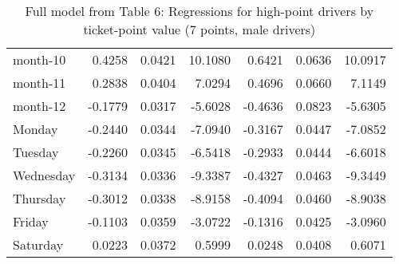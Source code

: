 \documentclass[10pt]{article}
\begin{document}
\begin{table}[ht]
\begin{tabular}{lrrrrrr}
  month-10 & 0.4258 & 0.0421 & 10.1080 & 0.6421 & 0.0636 & 10.0917 \\ 
  month-11 & 0.2838 & 0.0404 & 7.0294 & 0.4696 & 0.0660 & 7.1149 \\ 
  month-12 & -0.1779 & 0.0317 & -5.6028 & -0.4636 & 0.0823 & -5.6305 \\ 
  Monday & -0.2440 & 0.0344 & -7.0940 & -0.3167 & 0.0447 & -7.0852 \\ 
  Tuesday & -0.2260 & 0.0345 & -6.5418 & -0.2933 & 0.0444 & -6.6018 \\ 
  Wednesday & -0.3134 & 0.0336 & -9.3387 & -0.4327 & 0.0463 & -9.3449 \\ 
  Thursday & -0.3012 & 0.0338 & -8.9158 & -0.4094 & 0.0460 & -8.9038 \\ 
  Friday & -0.1103 & 0.0359 & -3.0722 & -0.1316 & 0.0425 & -3.0960 \\ 
  Saturday & 0.0223 & 0.0372 & 0.5999 & 0.0248 & 0.0408 & 0.6071 \\ 
   \hline
\end{tabular}
\caption{Full model from Table 6: Regressions for high-point drivers by ticket-point value (7 points, male drivers)} 
\label{tab_6_7_pts_no_age_M}
\end{table}


\clearpage
\pagebreak



\end{document}
